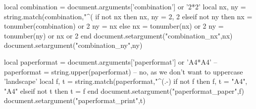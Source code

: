 
\startluacode
    local combination = document.arguments['combination'] or '2*2'
    local nx, ny = string.match(combination,"^(%
    if not nx then
        nx, ny = 2, 2
    elseif not ny then
        nx = tonumber(combination) or 2
        ny = nx
    else
        nx = tonumber(nx) or 2
        ny = tonumber(ny) or nx or 2
    end
    document.setargument("combination_nx",nx)
    document.setargument("combination_ny",ny)
\stopluacode

\startluacode
    local paperformat = document.arguments['paperformat'] or 'A4*A4'
 -- paperformat = string.upper(paperformat) -- no, as we don't want to uppercase 'landscape'
    local f, t = string.match(paperformat,"^(.-)%
    if not f then
        f, t = "A4", "A4"
    elseif not t then
        t = f
    end
    document.setargument("paperformat_paper",f)
    document.setargument("paperformat_print",t)
\stopluacode

\endinput
